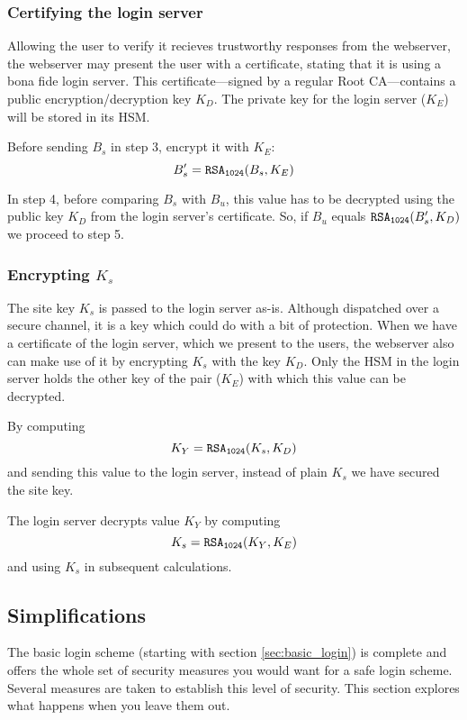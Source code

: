 \subsubsection{Certifying the login server}
Allowing the user to verify it recieves trustworthy responses from the webserver,
the webserver may present the user with a certificate,
stating that it is using a bona fide login server.
This certificate---signed by a regular Root CA---contains a public encryption/decryption key $K_D$.
The private key for the login server ($K_E$) will be stored in its HSM. 
\par
Before sending $B_s$ in step 3,
encrypt it with $K_E$:
\[B_s'=\texttt{\ensuremath{\mathtt{RSA_{1024}}}}(B_s, K_E)\]
\par
In step 4,
before comparing $B_s$ with $B_u$,
this value has to be decrypted using the public key $K_D$ from the login server's certificate.
So, if $B_u$ equals
\(\texttt{\ensuremath{\mathtt{RSA_{1024}}}}(B_s', K_D)\)
we proceed to step 5.

\subsubsection{Encrypting $K_s$}
The site key $K_s$ is passed to the login server as-is.
Although dispatched over a secure channel, it is a key which could do with a bit of protection.
When we have a certificate of the login server,
which we present to the users,
the webserver also can make use of it by encrypting $K_s$ with the key $K_D$.
Only the HSM in the login server holds the other key of the pair
($K_E$)
with which this value can be decrypted.
\par
By computing
\[K_Y=\texttt{\ensuremath{\mathtt{RSA_{1024}}}}(K_s, K_D)\]
and sending this value to the login server,
instead of plain $K_s$
we have secured the site key.
\par
The login server decrypts value $K_Y$ by computing
\[K_s=\texttt{\ensuremath{\mathtt{RSA_{1024}}}}(K_Y, K_E)\]
and using $K_s$ in subsequent calculations.

\subsection{Simplifications}
The basic login scheme
(starting with section \vref{sec:basic_login})
is complete and offers the whole set of security measures you would want for a safe login scheme.
Several measures are taken to establish this level of security.
This section explores what happens when you leave them out.
